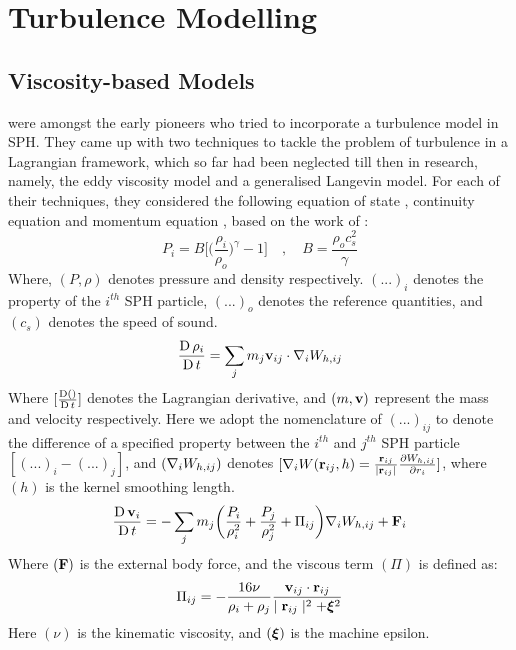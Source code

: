 
\chapter{Turbulence Modelling} %

\label{chap:turbulence-modelling}
\section{Viscosity-based Models}
\label{sec:visc-based-model}
\cite{VIOLEAU2002} were amongst the early pioneers who tried to incorporate a turbulence model in SPH. They came up with two techniques to tackle the problem of turbulence in a Lagrangian framework, which so far had been neglected till then in research, namely, the eddy viscosity model and a generalised Langevin model. For each of their techniques, they considered the following equation of state , continuity equation  and momentum equation , based on the work of \cite{Monaghan1992}:   
\begin{equation}
    P_i = B \Bigg[ \bigg( \frac{\rho_i}{\rho_o} \bigg)^{\gamma} - 1 \Bigg] \quad , \quad B = \frac{\rho_o c_s^2}{\gamma}
    \label{eq:violeau-eos}
\end{equation}
Where, $(P, \rho)$ denotes pressure and density respectively. $(...)_i$ denotes the property of the $i^{th}$ SPH particle, $(...)_o$ denotes the reference quantities, and $(c_s)$ denotes the speed of sound.
\begin{equation}
    \LagDerivative{\rho_i} = \sum_j m_j \VIJ \cdot \DWIJ
    \label{eq:violeau-continuity}
\end{equation}
Where $[\LagDerivative{()}]$ denotes the Lagrangian derivative, and $(m, \vect{v})$ represent the mass and velocity respectively. Here we adopt the nomenclature of $(...)_{ij}$ to denote the difference of a specified property between the $i^{th}$ and $j^{th}$ SPH particle $[(...)_{i} - (...)_{j}]$, and $(\DWIJ)$ denotes $[\nabla_i W(\RIJ,h) = \frac{\RIJ}{\RtwoIJ[]} \PartialDerivative[r_i]{\WIJ}]$, where $(h)$ is the kernel smoothing length.
\begin{equation}
    \LagDerivative{\vect{v}_i} = - \sum_j m_j \bigg( \frac{P_i}{\rho_i^2} + \frac{P_j}{\rho_j^2} + \Pi_{ij} \bigg) \DWIJ + \vect{F}_i
    \label{eq:violeau-mom}
\end{equation}
Where $(\vect{F})$ is the external body force, and the viscous term $(\Pi)$ is defined as:
\begin{equation}
    \Pi_{ij} = - \frac{16\nu}{\rho_i + \rho_j} \frac{\VIJ \cdot \RIJ}{\RtwoIJ + \MachineEpsilon^2} 
    \label{eq:violeau-diffusion-term}
\end{equation}
Here $(\nu)$ is the kinematic viscosity, and $(\MachineEpsilon)$ is the machine epsilon.



